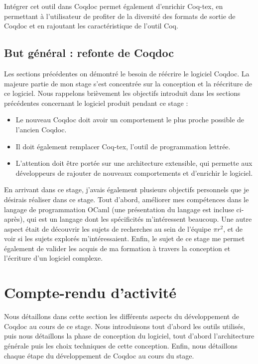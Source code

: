 \documentclass[a4paper, 11pt]{report}
\newcommand{\pir}[0]{\textbf{$\pi r^2$}\xspace}
\begin{document}
    Intégrer cet outil dans Coqdoc permet également d'enrichir Coq-tex, en
    permettant à l'utilisateur de profiter de la diversité des formats de
    sortie de Coqdoc et en rajoutant les caractéristique de l'outil Coq.

    \clearpage
    \subsection{But général : refonte de Coqdoc}
    Les sections précédentes on démontré le besoin de réécrire le logiciel
    Coqdoc. La majeure partie de mon stage s'est concentrée sur la conception
    et la réécriture de ce logiciel.
    Nous rappelons brièvement les objectifs introduit dans les sections
    précédentes concernant le logiciel produit pendant ce stage :
    \begin{itemize}
      \item Le nouveau Coqdoc doit avoir un comportement le plus proche
        possible de l'ancien Coqdoc.
      \item Il doit également remplacer Coq-tex, l'outil de programmation
        lettrée.
      \item L'attention doit être portée sur une architecture extensible, qui
        permette aux développeurs de rajouter de nouveaux comportements
        et d'enrichir le logiciel.
    \end{itemize}

    En arrivant dans ce stage, j'avais également plusieurs objectifs personnels
    que je désirais réaliser dans ce stage. Tout d'abord, améliorer
    mes compétences dans le langage de programmation OCaml (une présentation
    du langage est incluse ci-après), qui est un langage dont les spécificités
    m'intéressent beaucoup.
    Une autre aspect était de découvrir les sujets de recherches au sein de
    l'équipe \pir, et de voir si les sujets explorés m'intéressaient.
    Enfin, le sujet de ce stage me permet également de valider les acquis de
    ma formation à travers la conception et l'écriture d'un logiciel complexe.

  \section{Compte-rendu d'activité}
  Nous détaillons dans cette section les différents aspects du développement
  de Coqdoc au cours de ce stage.  Nous introduisons tout d'abord les outils
  utilisés, puis nous détaillons la phase de conception du logiciel, tout
  d'abord l'architecture générale puis les choix techniques de cette
  conception. Enfin, nous détaillons chaque étape du développement de Coqdoc
  au cours du stage.
\end{document}
